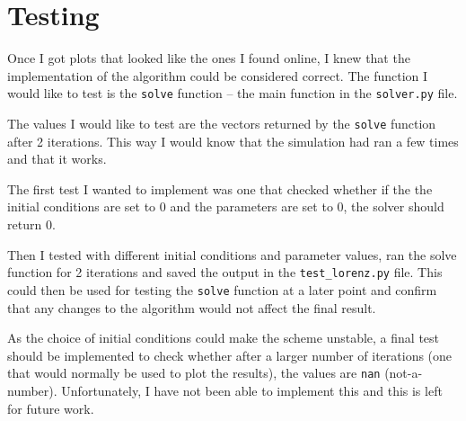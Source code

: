 \documentclass{article}
\def\code#1{\texttt{#1}}
\begin{document}
\section{Testing}

Once I got plots that looked like the ones I found online, I knew that the implementation of the algorithm could be considered correct. The function I would like to test is the \code{solve} function -- the main function in the \code{solver.py} file. 

The values I would like to test are the vectors returned by the \code{solve} function after 2 iterations. This way I would know that the simulation had ran a few times and that it works. 

The first test I wanted to implement was one that checked whether if the the initial conditions are set to $0$ and the parameters are set to $0$, the solver should return $0$.

Then I tested with different initial conditions and parameter values, ran the solve function for 2 iterations and saved the output in the \code{test\_lorenz.py} file. This could then be used for testing the \code{solve} function at a later point and confirm that any changes to the algorithm would not affect the final result. 

As the choice of initial conditions could make the scheme unstable, a final test should be implemented to check whether after a larger number of iterations (one that would normally be used to plot the results), the values are \code{nan} (not-a-number). Unfortunately, I have not been able to implement this and this is left for future work. 



\end{document}
